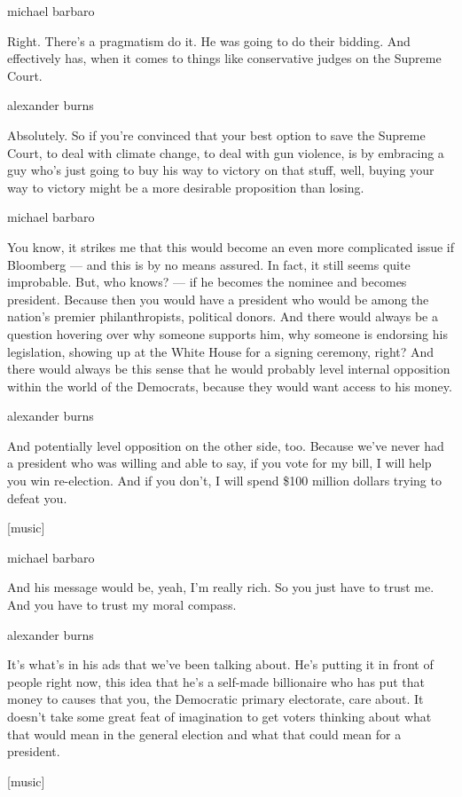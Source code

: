 michael barbaro

Right. There's a pragmatism do it. He was going to do their bidding. And
effectively has, when it comes to things like conservative judges on the
Supreme Court.

alexander burns

Absolutely. So if you're convinced that your best option to save the
Supreme Court, to deal with climate change, to deal with gun violence,
is by embracing a guy who's just going to buy his way to victory on that
stuff, well, buying your way to victory might be a more desirable
proposition than losing.

michael barbaro

You know, it strikes me that this would become an even more complicated
issue if Bloomberg --- and this is by no means assured. In fact, it
still seems quite improbable. But, who knows? --- if he becomes the
nominee and becomes president. Because then you would have a president
who would be among the nation's premier philanthropists, political
donors. And there would always be a question hovering over why someone
supports him, why someone is endorsing his legislation, showing up at
the White House for a signing ceremony, right? And there would always be
this sense that he would probably level internal opposition within the
world of the Democrats, because they would want access to his money.

alexander burns

And potentially level opposition on the other side, too. Because we've
never had a president who was willing and able to say, if you vote for
my bill, I will help you win re-election. And if you don't, I will spend
\$100 million dollars trying to defeat you.

{[}music{]}

michael barbaro

And his message would be, yeah, I'm really rich. So you just have to
trust me. And you have to trust my moral compass.

alexander burns

It's what's in his ads that we've been talking about. He's putting it in
front of people right now, this idea that he's a self-made billionaire
who has put that money to causes that you, the Democratic primary
electorate, care about. It doesn't take some great feat of imagination
to get voters thinking about what that would mean in the general
election and what that could mean for a president.

{[}music{]}


